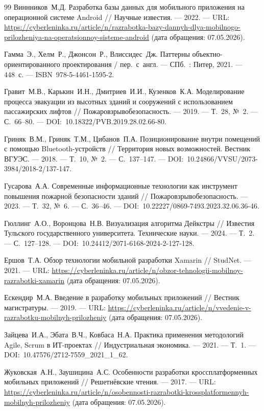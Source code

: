 \begin{thebibliography}{99}
	 Виннников~М.Д. Разработка базы данных для мобильного приложения на операционной системе Android // Научные известия. --- 2022. --- URL: \url{https://cyberleninka.ru/article/n/razrabotka-bazy-dannyh-dlya-mobilnogo-prilozheniya-na-operatsionnoy-sisteme-android} (дата обращения: 07.05.2026).
	
	 Гамма~Э., Хелм~Р., Джонсон~Р., Влиссидес~Дж. Паттерны объектно-ориентированного проектирования / пер.~с~англ. --- СПб.~: Питер, 2021. --- 448~с. --- ISBN~978-5-4461-1595-2.
	
	 Гравит~М.В., Карькин~И.Н., Дмитриев~И.И., Кузенков~К.А. Моделирование процесса эвакуации из высотных зданий и сооружений с использованием пассажирских лифтов // Пожаровзрывобезопасность. --- 2019. --- Т.~28, №~2. --- С.~66--80. --- DOI:~10.18322/PVB.2019.28.02.66-80.
	
	 Гриняк~В.М., Гриняк~Т.М., Цибанов~П.А. Позиционирование внутри помещений с помощью Bluetooth-устройств // Территория новых возможностей. Вестник ВГУЭС. --- 2018. --- Т.~10, №~2. --- С.~137--147. --- DOI:~10.24866/VVSU/2073-3984/2018-2/137-147.
	
	 Гусарова~А.А. Современные информационные технологии как инструмент повышения пожарной безопасности зданий // Пожаровзрывобезопасность. --- 2023. --- Т.~32, №~6. --- С.~36--46. --- DOI:~10.22227/0869-7493.2023.32.06.36-46.
	
	 Гюллинг~А.О., Воронцова~Н.В. Визуализация алгоритма Дейкстры // Известия Тульского государственного университета. Технические науки. --- 2024. --- Т.~2. --- С.~127--128. --- DOI:~10.24412/2071-6168-2024-2-127-128.
	
	 Ершов~Т.А. Обзор технологии мобильной разработки Xamarin // StudNet. --- 2021. --- URL: \url{https://cyberleninka.ru/article/n/obzor-tehnologii-mobilnoy-razrabotki-xamarin} (дата обращения: 07.05.2026).
	
	 Ескендир~М.А. Введение в разработку мобильных приложений // Вестник магистратуры. --- 2019. --- URL: \url{https://cyberleninka.ru/article/n/vvedenie-v-razrabotku-mobilnyh-prilozheniy} (дата обращения: 07.05.2026).
	
	 Зайцева~И.А., Эбата~В.Ч., Ковбаса~Н.А. Практика применения методологий Agile, Scrum в ИТ-проектах // Индустриальная экономика. --- 2021. --- Т.~1. --- DOI:~10.47576/2712-7559\_2021\_1\_62.
	
	 Жуковская~А.Н., Заушицина~А.С. Особенности разработки кроссплатформенных мобильных приложений // Решетнёвские чтения. --- 2017. --- URL: \url{https://cyberleninka.ru/article/n/osobennosti-razrabotki-krossplatformennyh-mobilnyh-prilozheniy} (дата обращения: 07.05.2026).
	

\end{thebibliography}
